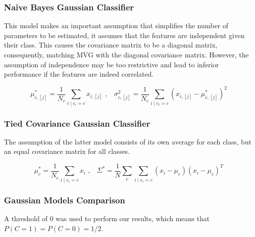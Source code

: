 
\subsubsection{Naive Bayes Gaussian Classifier}
\label{subsubsec:naiveBayesGaussianClassifier}
This model makes an important assumption that simplifies the number of parameters to be estimated,
it assumes that the features are independent given their class.
This causes the covariance matrix to be a diagonal matrix, consequently, matching MVG with the diagonal covariance matrix.
However, the assumption of independence may be too restrictive and lead to inferior performance if the features are indeed correlated.

\begin{equation}
    \mu_{c,[j]}^* = \frac{1}{N_c} \sum_{i\mid c_i = c} x_{i,[j]}\text{ ,}\quad
    \sigma_{c,[j]}^2 = \frac{1}{N_c} \sum_{i\mid c_i = c} (x_{i,[j]} - \mu_{c,[j]}^*)^2
    \label{eq:meanAndVarianceNBG}
\end{equation}


\subsubsection{Tied Covariance Gaussian Classifier}
\label{subsubsec:tiedCovarianceGaussianClassifier}
The assumption of the latter model consists of its own average for each class, but an equal covariance matrix for all classes.

\begin{equation}
    \mu_c^* = \frac{1}{N_c} \sum_{i\mid c_i=c} x_i\text{ ,}\quad
    \Sigma^* = \frac{1}{N} \sum_{c} \sum_{i\mid c_i = c} (x_{i} - \mu_c)(x_{i} - \mu_c)^T
    \label{eq:tiedCovariance}
\end{equation}

\subsubsection{Gaussian Models Comparison}
\label{subsubsec:gaussianModelsComparison}
A threshold of \(0\) was used to perform our results, which means that \(P(C=1)=P(C=0)=1/2\).

